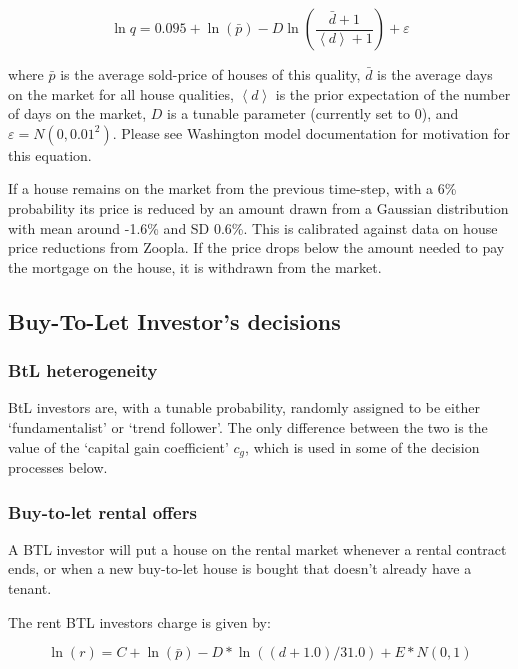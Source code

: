 \documentclass{article}
\begin{document}
\begin{equation}
\ln q=0.095+\ln (\bar{p})-D\ln \left( \frac{\bar{d}+1}{\left\langle
d\right\rangle +1}\right) +\varepsilon
\end{equation}

\bigskip

where $\bar{p}$ is the average sold-price of houses of this quality, $\bar{d}
$ is the average days on the market for all house qualities, $\left\langle
d\right\rangle $ is the prior expectation of the number of days on the
market, $D$ is a tunable parameter (currently set to 0), and $\varepsilon
=N(0,0.01^{2})$. Please see Washington model documentation for motivation for this equation.

If a house remains on the market from the previous time-step, with a 6\%
probability its price is reduced by an amount drawn from a Gaussian
distribution with mean around -1.6\% and SD 0.6\%. This is calibrated
against data on house price reductions from Zoopla. If the price drops below the amount needed to pay the mortgage on the house, it is withdrawn from the market.


\subsection{Buy-To-Let Investor's decisions}
\subsubsection{BtL heterogeneity}
BtL investors are, with a tunable probability, randomly assigned to be either `fundamentalist' or `trend follower'. The only difference between the two is the value of the `capital gain coefficient' $c_{g}$, which is used in some of the decision processes below.

\subsubsection{Buy-to-let rental offers}
A BTL investor will put a house on the rental market
whenever a rental contract ends, or when a new buy-to-let house is bought
that doesn't already have a tenant. 

The rent BTL investors charge is given by:

\begin{equation}
\ln(r)=C+\ln (\bar{p})-D\ast \ln((d+1.0)/31.0)+E\ast N(0,1)
\end{equation}

\bigskip
\end{document}
